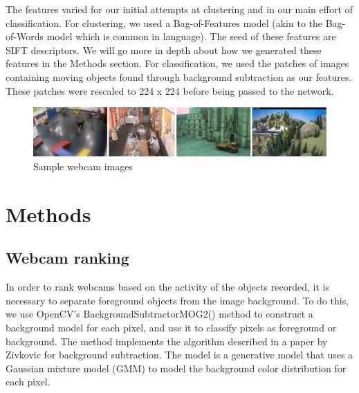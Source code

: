 \documentclass[10pt]{article} %
\begin{document}
The features varied for our initial attempts at clustering and in our main
effort of classification. For clustering, we used a Bag-of-Features model (akin
to the Bag-of-Words model which is common in language). The seed of these
features are SIFT descriptors. We will go more in depth about how we generated
these features in the Methods section. For classification, we used the patches
of images containing moving objects found through background subtraction as our
features. These patches were rescaled to 224 x 224 before being passed to the
network.

\begin{figure}[h]
\caption{Sample webcam images}
\includegraphics[scale = 0.25]{samples}
\end{figure}

\section{Methods}
\subsection{Webcam ranking}
In order to rank webcams based on the activity of the objects recorded, it is necessary to separate foreground objects from the image background. To do this, we use OpenCV's BackgroundSubtractorMOG2() method to construct a background model for each pixel, and use it to classify pixels as foreground or background. The method implements the algorithm described in a paper by Zivkovic \cite{zivkovic} for background subtraction. The model is a generative model that uses a Gaussian mixture model (GMM) to model the background color distribution for each pixel. 
\end{document}
